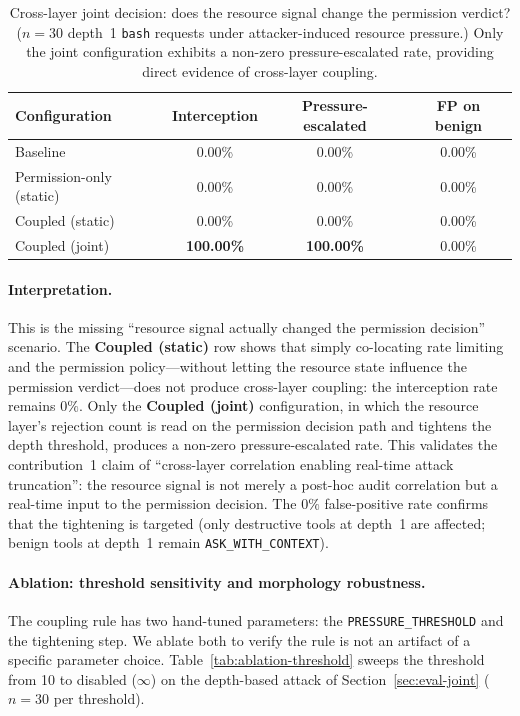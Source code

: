 \begin{table}[t]
\centering
\caption{Cross-layer joint decision: does the resource signal change
the permission verdict? ($n=30$ depth~1 \texttt{bash} requests under
attacker-induced resource pressure.) Only the joint configuration
exhibits a non-zero pressure-escalated rate, providing direct evidence
of cross-layer coupling.}
\label{tab:joint-decision}
\begin{tabular}{lccc}
\toprule
Configuration & Interception & Pressure-escalated & FP on benign \\
\midrule
Baseline                  & 0.00\% & 0.00\% & 0.00\% \\
Permission-only (static)  & 0.00\% & 0.00\% & 0.00\% \\
Coupled (static)          & 0.00\% & 0.00\% & 0.00\% \\
Coupled (joint)           & \textbf{100.00\%} & \textbf{100.00\%} & 0.00\% \\
\bottomrule
\end{tabular}
\end{table}

\paragraph{Interpretation.}
This is the missing ``resource signal actually changed the permission
decision'' scenario. The \textbf{Coupled (static)} row shows that simply
co-locating rate limiting and the permission policy---without letting
the resource state influence the permission verdict---does not produce
cross-layer coupling: the interception rate remains $0\%$. Only the
\textbf{Coupled (joint)} configuration, in which the resource layer's
rejection count is read on the permission decision path and tightens
the depth threshold, produces a non-zero pressure-escalated rate. This
validates the contribution~1 claim of ``cross-layer correlation
enabling real-time attack truncation'': the resource signal is not
merely a post-hoc audit correlation but a real-time input to the
permission decision. The $0\%$ false-positive rate confirms that the
tightening is targeted (only destructive tools at depth~1 are affected;
benign tools at depth~1 remain \texttt{ASK\_WITH\_CONTEXT}).

\paragraph{Ablation: threshold sensitivity and morphology robustness.}
The coupling rule has two hand-tuned parameters: the
\texttt{PRESSURE\_THRESHOLD} and the tightening step. We ablate both to
verify the rule is not an artifact of a specific parameter choice.
Table~\ref{tab:ablation-threshold} sweeps the threshold from 10 to
disabled ($\infty$) on the depth-based attack of
Section~\ref{sec:eval-joint} ($n=30$ per threshold).

